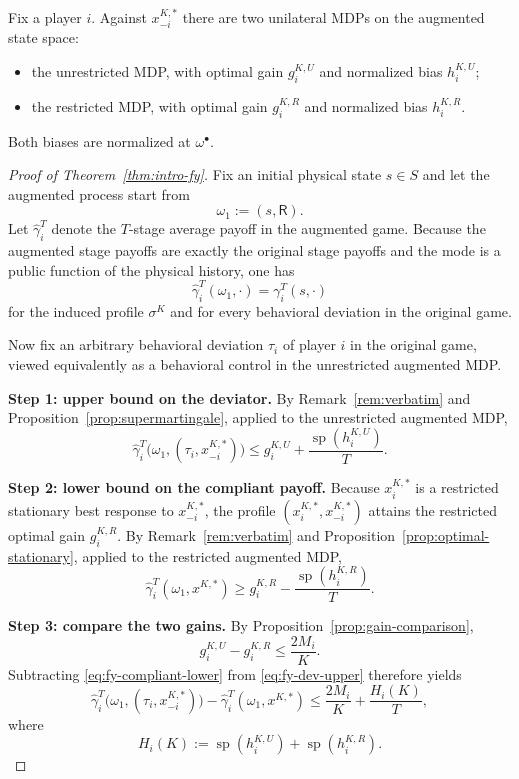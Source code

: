 \documentclass[11pt]{article}
\theoremstyle{definition}
\newcommand{\1}{\mathbf{1}}
\DeclareMathOperator{\spn}{sp}
\begin{document}
Fix a player $i$. Against $x_{-i}^{K,*}$ there are two unilateral MDPs on the augmented state space:
\begin{itemize}[leftmargin=2.4em]
\item the unrestricted MDP, with optimal gain $g_i^{K,U}$ and normalized bias $h_i^{K,U}$;
\item the restricted MDP, with optimal gain $g_i^{K,R}$ and normalized bias $h_i^{K,R}$.
\end{itemize}
Both biases are normalized at $\omega^\bullet$.

\begin{proof}[Proof of Theorem~\ref{thm:intro-fy}]
Fix an initial physical state $s\in S$ and let the augmented process start from
\[
\omega_1:=(s,\mathsf R).
\]
Let $\widehat\gamma_i^T$ denote the $T$-stage average payoff in the augmented game. Because the augmented stage payoffs are exactly the original stage payoffs and the mode is a public function of the physical history, one has
\[
\widehat\gamma_i^T(\omega_1,\cdot)=\gamma_i^T(s,\cdot)
\]
for the induced profile $\sigma^K$ and for every behavioral deviation in the original game.

Now fix an arbitrary behavioral deviation $\tau_i$ of player $i$ in the original game, viewed equivalently as a behavioral control in the unrestricted augmented MDP.

\smallskip
\noindent
\textbf{Step 1: upper bound on the deviator.}
By Remark~\ref{rem:verbatim} and Proposition~\ref{prop:supermartingale}, applied to the unrestricted augmented MDP,
\begin{equation}\label{eq:fy-dev-upper}
\widehat\gamma_i^T\bigl(\omega_1,(\tau_i,x_{-i}^{K,*})\bigr)
\le
g_i^{K,U}+\frac{\spn(h_i^{K,U})}{T}.
\end{equation}

\smallskip
\noindent
\textbf{Step 2: lower bound on the compliant payoff.}
Because $x_i^{K,*}$ is a restricted stationary best response to $x_{-i}^{K,*}$, the profile $(x_i^{K,*},x_{-i}^{K,*})$ attains the restricted optimal gain $g_i^{K,R}$. By Remark~\ref{rem:verbatim} and Proposition~\ref{prop:optimal-stationary}, applied to the restricted augmented MDP,
\begin{equation}\label{eq:fy-compliant-lower}
\widehat\gamma_i^T(\omega_1,x^{K,*})
\ge
g_i^{K,R}-\frac{\spn(h_i^{K,R})}{T}.
\end{equation}

\smallskip
\noindent
\textbf{Step 3: compare the two gains.}
By Proposition~\ref{prop:gain-comparison},
\[
g_i^{K,U}-g_i^{K,R}\le \frac{2M_i}{K}.
\]
Subtracting \eqref{eq:fy-compliant-lower} from \eqref{eq:fy-dev-upper} therefore yields
\[
\widehat\gamma_i^T\bigl(\omega_1,(\tau_i,x_{-i}^{K,*})\bigr)-\widehat\gamma_i^T(\omega_1,x^{K,*})
\le
\frac{2M_i}{K}+\frac{H_i(K)}{T},
\]
where
\[
H_i(K):=\spn(h_i^{K,U})+\spn(h_i^{K,R}).
\]


\end{proof}
\end{document}
